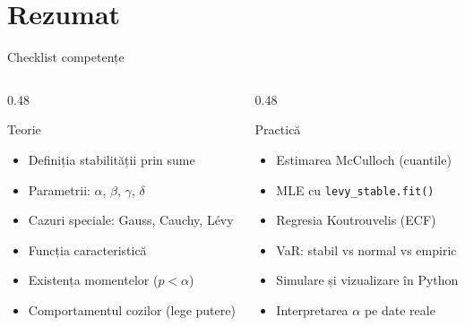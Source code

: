 \documentclass[9pt, aspectratio=169, t]{beamer}
\theoremstyle{definition}
\begin{document}
\section{Rezumat}

\begin{frame}{Checklist competențe}
\begin{columns}[T]
\begin{column}{0.48\textwidth}
\begin{block}{Teorie}
\begin{itemize}
    \item[$\square$] Definiția stabilității prin sume
    \item[$\square$] Parametrii: $\alpha$, $\beta$, $\gamma$, $\delta$
    \item[$\square$] Cazuri speciale: Gauss, Cauchy, L\'{e}vy
    \item[$\square$] Funcția caracteristică
    \item[$\square$] Existența momentelor ($p < \alpha$)
    \item[$\square$] Comportamentul cozilor (lege putere)
\end{itemize}
\end{block}
\end{column}
\begin{column}{0.48\textwidth}
\begin{block}{Practică}
\begin{itemize}
    \item[$\square$] Estimarea McCulloch (cuantile)
    \item[$\square$] MLE cu \texttt{levy\_stable.fit()}
    \item[$\square$] Regresia Koutrouvelis (ECF)
    \item[$\square$] VaR: stabil vs normal vs empiric
    \item[$\square$] Simulare și vizualizare în Python
    \item[$\square$] Interpretarea $\alpha$ pe date reale
\end{itemize}
\end{block}
\end{column}
\end{columns}
\end{frame}

\end{document}
